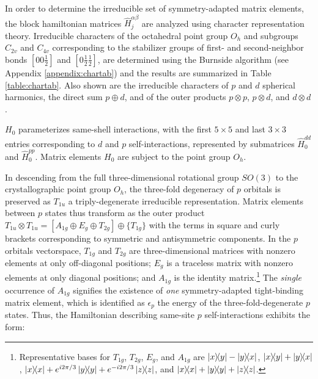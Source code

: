\documentclass[twocolumn,showpacs,preprintnumbers,superscriptaddress,prb,floatfix,aps,10pt]{revtex4-1}
\newcommand*{\ham}{\hat{H}}
\newcommand*{\x}{\times}
\begin{document}
In order to determine the irreducible set of symmetry-adapted matrix elements, the block hamiltonian matrices $\ham_{j}^{\alpha\beta}$ are analyzed using character representation theory. 
Irreducible characters of the octahedral point group $O_h$ and subgroups $C_{2v}$ and $C_{4v}$ corresponding to the stabilizer groups of first- and second-neighbor bonds $[0 0 \frac{1}{2}]$ and $[0 \frac{1}{2} \frac{1}{2}]$, are determined using the Burnside algorithm (see Appendix \ref{appendix:chartab}) and the results are summarized in Table \ref{table:chartab}. Also shown are the irreducible characters of $p$ and $d$ spherical harmonics, the direct sum $p \oplus d$, and of the outer products $p \otimes p$, $p \otimes d$, and $d \otimes d$.

$H_0$ parameterizes same-shell interactions, with the first $5\x5$ and last $3\x3$ entries corresponding to $d$ and $p$ self-interactions, represented by submatrices $\hat{H}_0^{dd}$ and $\hat{H}_0^{pp}$. Matrix elements $H_0$ are subject to the point group $O_h$.

In descending from the full three-dimensional rotational group $SO(3)$ to the crystallographic point group $O_h$, the three-fold degeneracy of $p$ orbitals is preserved as $T_{1u}$ a triply-degenerate irreducible representation. Matrix elements between $p$ states thus transform as the outer product $T_{1u} \otimes T_{1u} = [A_{1g} \oplus E_g \oplus T_{2g}] \oplus \{T_{1g}\}$ with the terms in square and curly brackets corresponding to symmetric and antisymmetric components. In the $p$ orbitals vectorspace, $T_{1g}$ and $T_{2g}$ are three-dimensional matrices with nonzero elements at only off-diagonal positions; $E_g$ is a traceless matrix with nonzero elements at only diagonal positions; and $A_{1g}$ is the identity matrix.\footnote{Representative bases for $T_{1g}$, $T_{2g}$, $E_g$, and $A_{1g}$ are $\ketbra{x}{y} - \ketbra{y}{x}$, $\ketbra{x}{y} + \ketbra{y}{x}$, $\ketbra{x}{x} + e^{i2\pi/3}\ketbra{y}{y} + e^{-i2\pi/3}\ketbra{z}{z}$, and $\ketbra{x}{x} + \ketbra{y}{y} + \ketbra{z}{z}$.}
 The \emph{single} occurrence of $A_{1g}$ signifies the existence of \emph{one} symmetry-adapted tight-binding matrix element, which is identified as $\epsilon_p$ the energy of the three-fold-degenerate $p$ states. Thus, the Hamiltonian describing same-site $p$ self-interactions exhibits the form:
\end{document}
